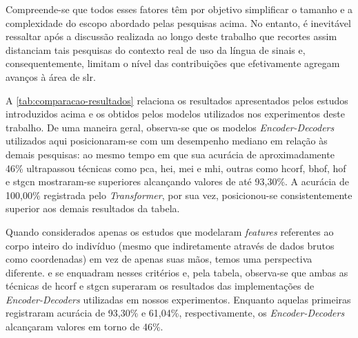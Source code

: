 Compreende-se que todos esses fatores têm por objetivo simplificar o tamanho e a complexidade do escopo abordado pelas pesquisas acima. No entanto, é inevitável ressaltar após a discussão realizada ao longo deste trabalho que recortes assim distanciam tais pesquisas do contexto real de uso da língua de sinais e, consequentemente, limitam o nível das contribuições que efetivamente agregam avanços à área de \acrshort{slr}.







A \autoref{tab:comparacao-resultados} relaciona os resultados apresentados pelos estudos introduzidos acima e os obtidos pelos modelos utilizados nos experimentos deste trabalho.
De uma maneira geral, observa-se que os modelos \textit{Encoder-Decoders} utilizados aqui posicionaram-se com um desempenho mediano em relação às demais pesquisas: ao mesmo tempo em que sua acurácia de aproximadamente 46\% ultrapassou técnicas como \acrshort{pca}, \acrshort{hei}, \acrshort{mei} e \acrshort{mhi}, outras como \acrshort{hcorf}, \acrshort{bhof}, \acrshort{hof} e \acrshort{stgcn} mostraram-se superiores alcançando valores de até 93,30\%.
A acurácia de 100,00\% registrada pelo \textit{Transformer}, por sua vez, posicionou-se consistentemente superior aos demais resultados da tabela.

Quando considerados apenas os estudos que modelaram \textit{features} referentes ao corpo inteiro do indivíduo (mesmo que indiretamente através de dados brutos como coordenadas) em vez de apenas suas mãos, temos uma perspectiva diferente.  e  se enquadram nesses critérios e, pela tabela, observa-se que ambas as técnicas de \acrshort{hcorf} e \acrshort{stgcn} superaram os resultados das implementações de \textit{Encoder-Decoders} utilizadas em nossos experimentos. Enquanto aquelas primeiras registraram acurácia de 93,30\% e 61,04\%, respectivamente, os \textit{Encoder-Decoders} alcançaram valores em torno de 46\%.


